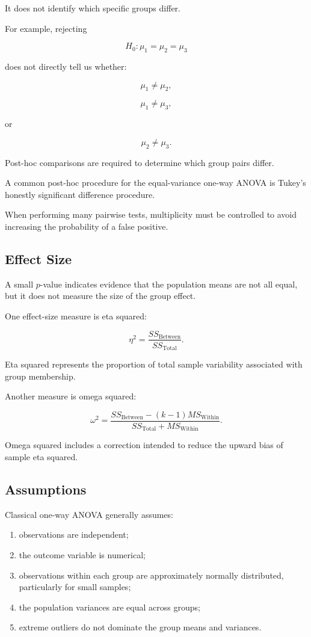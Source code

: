 \documentclass[11pt]{article}
\begin{document}
It does not identify which specific groups differ.

For example, rejecting

\[
H_0:\mu_1=\mu_2=\mu_3
\]

does not directly tell us whether:

\[
\mu_1\neq\mu_2,
\]

\[
\mu_1\neq\mu_3,
\]

or

\[
\mu_2\neq\mu_3.
\]

Post-hoc comparisons are required to determine which group pairs differ.

A common post-hoc procedure for the equal-variance one-way ANOVA is
Tukey's honestly significant difference procedure.

When performing many pairwise tests, multiplicity must be controlled to
avoid increasing the probability of a false positive.

\subsection{Effect Size}

A small \(p\)-value indicates evidence that the population means are not
all equal, but it does not measure the size of the group effect.

One effect-size measure is eta squared:

\[
\boxed{
\eta^2
=
\frac{
SS_{\mathrm{Between}}
}{
SS_{\mathrm{Total}}
}.
}
\]

Eta squared represents the proportion of total sample variability
associated with group membership.

Another measure is omega squared:

\[
\boxed{
\omega^2
=
\frac{
SS_{\mathrm{Between}}
-
(k-1)MS_{\mathrm{Within}}
}{
SS_{\mathrm{Total}}
+
MS_{\mathrm{Within}}
}.
}
\]

Omega squared includes a correction intended to reduce the upward bias
of sample eta squared.

\subsection{Assumptions}

Classical one-way ANOVA generally assumes:

\begin{enumerate}[noitemsep]
    \item observations are independent;

    \item the outcome variable is numerical;

    \item observations within each group are approximately normally
    distributed, particularly for small samples;

    \item the population variances are equal across groups;

    \item extreme outliers do not dominate the group means and
    variances.
\end{enumerate}
\end{document}
